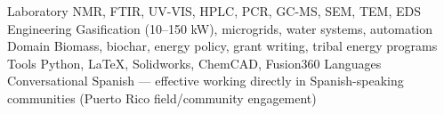 
\begin{cvskills}
  \cvskill
    {Laboratory}
    {NMR, FTIR, UV-VIS, HPLC, PCR, GC-MS, SEM, TEM, EDS}
  \cvskill
    {Engineering}
    {Gasification (10--150 kW), microgrids, water systems, automation}
  \cvskill
    {Domain}
    {Biomass, biochar, energy policy, grant writing, tribal energy programs}
  \cvskill
    {Tools}
    {Python, \LaTeX, Solidworks, ChemCAD, Fusion360}
  \cvskill
    {Languages}
    {Conversational Spanish --- effective working directly in Spanish-speaking communities (Puerto Rico field/community engagement)}
\end{cvskills}
